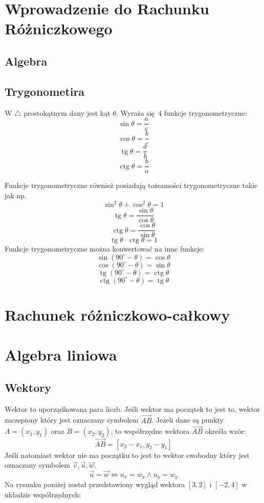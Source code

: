 \documentclass[12pt, a4paper]{article}
\DeclareMathOperator{\tg}{tg}
\DeclareMathOperator{\ctg}{ctg}
\begin{document}
\tableofcontents
\newpage
\section{Wprowadzenie do Rachunku Różniczkowego}
\subsection{Algebra}
\subsection{Trygonometira}
W $\triangle$ prostokątnym dany jest kąt $\theta$. Wyraża się 4 funkcje trygonometryczne:
$$\sin\theta=\frac{a}{c}$$
$$\cos\theta=\frac{b}{c}$$
$$\tg\theta=\frac{a}{b}$$
$$\ctg\theta=\frac{b}{a}$$
\begin{center}
\end{center}
Funkcje trygonometryczne również posiadają tożsamości trygonometryczne takie jak np.
$$\sin^2\theta+\cos^2\theta = 1$$
$$\tg\theta=\frac{\sin\theta}{\cos\theta}$$
$$\ctg\theta=\frac{\cos\theta}{\sin\theta}$$
$$\tg\theta\cdot\ctg\theta=1$$
Funkcje trygonometryczne można konwertować na inne funkcje:
$$\sin(90^{\circ}-\theta)=\cos\theta$$
$$\cos(90^{\circ}-\theta)=\sin\theta$$
$$\tg(90^{\circ}-\theta)=\ctg\theta$$
$$\ctg(90^{\circ}-\theta)=\tg\theta$$
\section{Rachunek różniczkowo-całkowy}
\section{Algebra liniowa}
\subsection{Wektory}
Wektor to uporządkowana para liczb. Jeśli wektor ma początek to jest to, wektor
zaczepiony który jest oznaczany symbolem $\overrightarrow{AB}$. Jeżeli dane są punkty
$A = (x_1,y_1)$ oraz $B = (x_2,y_2)$,
to współrzędne wektora $\overrightarrow{AB}$ określa wzór: $$\overrightarrow{AB} = [x_2-x_1,y_2-y_1]$$
Jeśli natomiast wektor nie ma początku to jest to wektor swobodny który
jest oznaczany symbolem $\overrightarrow{v}, \overrightarrow{u}, \overrightarrow{w}$.
$$\overrightarrow{u} = \overrightarrow{w} \Longleftrightarrow u_x = w_x \wedge u_y = w_y$$
Na rysunku poniżej został przedstawiony wygląd wektora $[3,2]$ i $[-2,4]$ w układzie współrzędnych:
\end{document}
